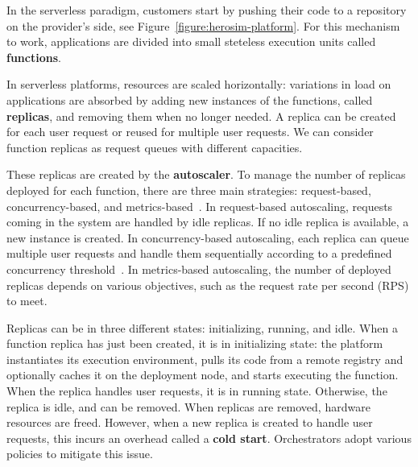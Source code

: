In the serverless paradigm, customers start by pushing their code to a repository on the provider's side, see Figure~\ref{figure:herosim-platform}. %
For this mechanism to work, applications are divided into small steteless execution units called \textbf{functions}. %

In serverless platforms, resources are scaled horizontally: variations in load on applications are absorbed by adding new instances of the functions, called \textbf{replicas}, and removing them when no longer needed. A replica can be created for each user request or reused for multiple user requests. We can consider function replicas as request queues with different capacities.

These replicas are created by the \textbf{autoscaler}. To manage the number of replicas deployed for each function, there are three main strategies: request-based, concurrency-based, and metrics-based~\cite{mahmoudiSimFaaSPerformanceSimulator2021}. In request-based autoscaling, requests coming in the system are handled by idle replicas. If no idle replica is available, a new instance is created. In concurrency-based autoscaling, each replica can queue multiple user requests and handle them sequentially according to a predefined concurrency threshold~\cite{herofake}. In metrics-based autoscaling, the number of deployed replicas depends on various objectives, such as the request rate per second (RPS) to meet. %

Replicas can be in three different states: initializing, running, and idle.%
When a function replica has just been created, it is in initializing state: the platform instantiates its execution environment, pulls its code from a remote registry and optionally caches it on the deployment node, and starts executing the function. When the replica handles user requests, it is in running state. Otherwise, the replica is idle, and can be removed.
When replicas are removed, hardware resources are freed. However, when a new replica is created to handle user requests, this incurs an overhead called a \textbf{cold start}. Orchestrators adopt various policies to mitigate this issue.%

